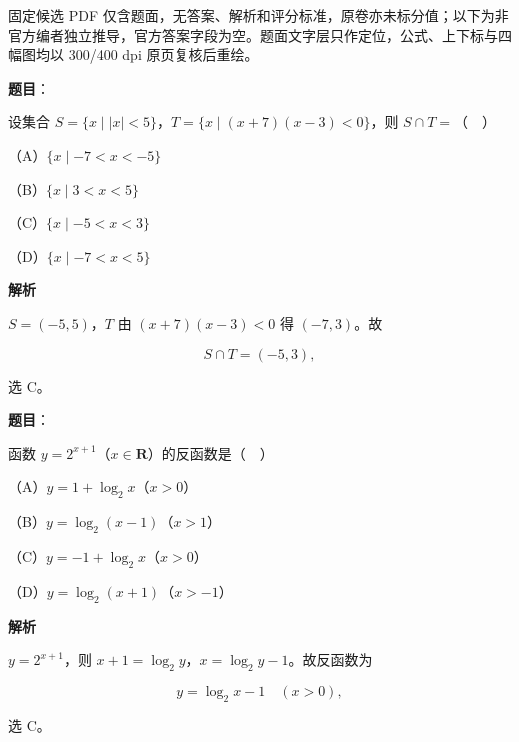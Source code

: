 

\begin{gktip}
固定候选 PDF 仅含题面，无答案、解析和评分标准，原卷亦未标分值；以下为非官方编者独立推导，官方答案字段为空。题面文字层只作定位，公式、上下标与四幅图均以 300/400 dpi 原页复核后重绘。
\end{gktip}

\begin{answer}

\textbf{题目}：

设集合 $S=\{x\mid |x|<5\}$，$T=\{x\mid (x+7)(x-3)<0\}$，则 $S\cap T=$（　）

（A）$\{x\mid -7<x<-5\}$

（B）$\{x\mid 3<x<5\}$

（C）$\{x\mid -5<x<3\}$

（D）$\{x\mid -7<x<5\}$

\textbf{解析}

$S=(-5,5)$，$T$ 由 $(x+7)(x-3)<0$ 得 $(-7,3)$。故

\nopagebreak[4]
\[S\cap T=(-5,3),\]

选 C。


\end{answer}
\begin{answer}

\textbf{题目}：

函数 $y=2^{x+1}$（$x\in\mathbf R$）的反函数是（　）

（A）$y=1+\log_2x$（$x>0$）

（B）$y=\log_2(x-1)$（$x>1$）

（C）$y=-1+\log_2x$（$x>0$）

（D）$y=\log_2(x+1)$（$x>-1$）

\textbf{解析}

$y=2^{x+1}$，则 $x+1=\log_2y$，$x=\log_2y-1$。故反函数为

\nopagebreak[4]
\[y=\log_2x-1\quad(x>0),\]

选 C。


\end{answer}
